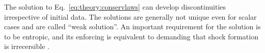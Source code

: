 The solution to Eq.~\eqref{eq:theory:conservlaws} can develop discontinuities
irrespective of initial data. The solutions are generally not 
unique even for scalar cases and are called ``weak solution''. %
An important requirement for the solution is to be entropic, and its 
enforcing is equivalent to demanding that shock formation is irrecersible
\citep{LeVeque:1992}.

